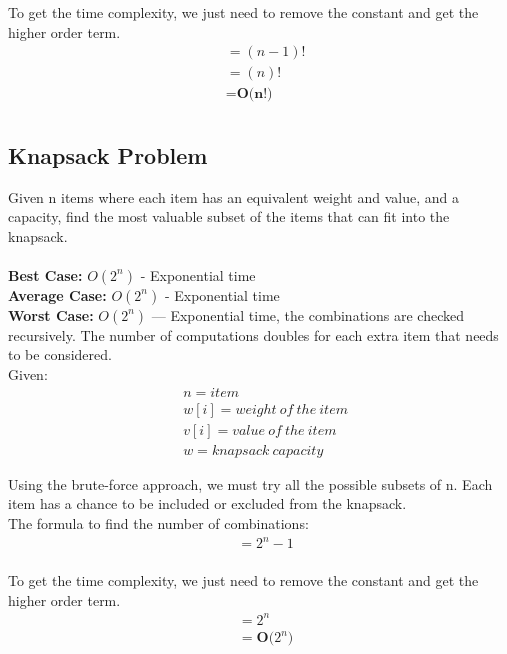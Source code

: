 \documentclass{article}
\begin{document}
To get the time complexity, we just need to remove the constant and get the higher order term.
\begin{align*}
    &\text{} = (n - 1)!\\
    &\text{} = (n)!\\
    &\text{} = \textbf{O(n!)}\\
\end{align*}


\subsection{Knapsack Problem}
Given n items where each item has an equivalent weight and value, and a capacity, find the most valuable subset of the items that can fit into the knapsack.\\
\\
\textbf{Best Case:} \(O(2^n)\) - Exponential time\\
\textbf{Average Case:} \(O(2^n)\) - Exponential time\\
\textbf{Worst Case:} \(O(2^n)\) — Exponential time, the combinations are checked recursively. The number of computations doubles for each extra item that needs to be considered.\\

Given: 
\begin{align*}
    &\text{} n = item\\
    &\text{} w[i] = weight \ of \ the \ item \\
    &\text{} v[i] = value \ of\  the \ item \\
    &\text{} w = knapsack \ capacity 
\end{align*}

Using the brute-force approach, we must try all the possible subsets of n. Each item has a chance to be included or excluded from the knapsack.\\

The formula to find the number of combinations:
\begin{align*}
    &\text{} = 2^n - 1\\
\end{align*}

To get the time complexity, we just need to remove the constant and get the higher order term.
\begin{align*}
    &\text{} = 2^n\\
    &\text{} = \textbf{O(\(2^n\))}\\
\end{align*}
\end{document}
